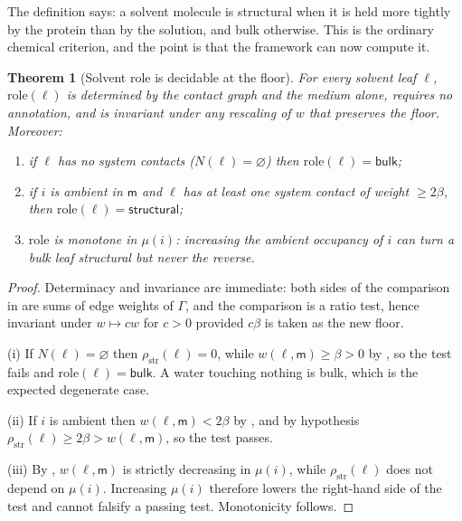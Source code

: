 \documentclass[11pt,twocolumn,a4paper]{article}
\theoremstyle{thmstyle}
\newtheorem{theorem}{Theorem}[section]
\theoremstyle{definition}
\theoremstyle{remark}
\newcommand{\flo}{\beta}
\newcommand{\res}{\rho}
\newcommand{\med}{\mathsf{m}}
\newcommand{\Str}{\textsf{structural}}
\newcommand{\Blk}{\textsf{bulk}}
\begin{document}
The definition says: a solvent molecule is structural when it is held more
tightly by the protein than by the solution, and bulk otherwise. This is
the ordinary chemical criterion, and the point is that the framework can
now compute it.

\begin{theorem}[Solvent role is decidable at the floor]
\label{thm:solvent-role}
For every solvent leaf $\ell$, $\mathrm{role}(\ell)$ is determined by the
contact graph and the medium alone, requires no annotation, and is
invariant under any rescaling of $w$ that preserves the floor. Moreover:
\begin{enumerate}[label=(\roman*),leftmargin=1.8em,itemsep=2pt]
\item if $\ell$ has no system contacts ($N(\ell)=\varnothing$) then
$\mathrm{role}(\ell)=\Blk$;
\item if $i$ is ambient in $\med$ and $\ell$ has at least one system
contact of weight $\ge 2\flo$, then $\mathrm{role}(\ell)=\Str$;
\item $\mathrm{role}$ is monotone in $\mu(i)$: increasing the ambient
occupancy of $i$ can turn a bulk leaf structural but never the reverse.
\end{enumerate}
\end{theorem}

\begin{proof}
Determinacy and invariance are immediate: both sides of the comparison in
 are sums of edge weights of $\Gamma$, and the
comparison is a ratio test, hence invariant under $w\mapsto cw$ for
$c>0$ provided $c\flo$ is taken as the new floor.

(i) If $N(\ell)=\varnothing$ then $\res_{\mathrm{str}}(\ell)=0$, while
$w(\ell,\med)\ge\flo>0$ by , so the test fails and
$\mathrm{role}(\ell)=\Blk$. A water touching nothing is bulk, which is the
expected degenerate case.

(ii) If $i$ is ambient then $w(\ell,\med)<2\flo$ by
, and by hypothesis
$\res_{\mathrm{str}}(\ell)\ge 2\flo > w(\ell,\med)$, so the test passes.

(iii) By , $w(\ell,\med)$ is strictly decreasing in
$\mu(i)$, while $\res_{\mathrm{str}}(\ell)$ does not depend on $\mu(i)$.
Increasing $\mu(i)$ therefore lowers the right-hand side of the test and
cannot falsify a passing test. Monotonicity follows.
\end{proof}
\end{document}
